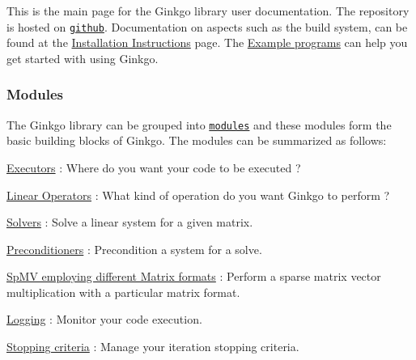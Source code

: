 This is the main page for the Ginkgo library user documentation. The repository is hosted on \href{https://github.com/ginkgo-project/ginkgo}{\tt github}. Documentation on aspects such as the build system, can be found at the \hyperlink{install_ginkgo}{Installation Instructions} page. The \hyperlink{Examples}{Example programs} can help you get started with using Ginkgo.

\subsubsection*{Modules}

The Ginkgo library can be grouped into \href{modules.html}{\tt modules} and these modules form the basic building blocks of Ginkgo. The modules can be summarized as follows\+:


\begin{DoxyItemize}
\item \hyperlink{group__Executor}{Executors} \+: Where do you want your code to be executed ?
\item \hyperlink{group__LinOp}{Linear Operators} \+: What kind of operation do you want Ginkgo to perform ?
\begin{DoxyItemize}
\item \hyperlink{group__solvers}{Solvers} \+: Solve a linear system for a given matrix.
\item \hyperlink{group__precond}{Preconditioners} \+: Precondition a system for a solve.
\item \hyperlink{group__mat__formats}{Sp\+MV employing different Matrix formats} \+: Perform a sparse matrix vector multiplication with a particular matrix format.
\end{DoxyItemize}
\item \hyperlink{group__log}{Logging} \+: Monitor your code execution.
\item \hyperlink{group__stop}{Stopping criteria} \+: Manage your iteration stopping criteria. 
\end{DoxyItemize}
